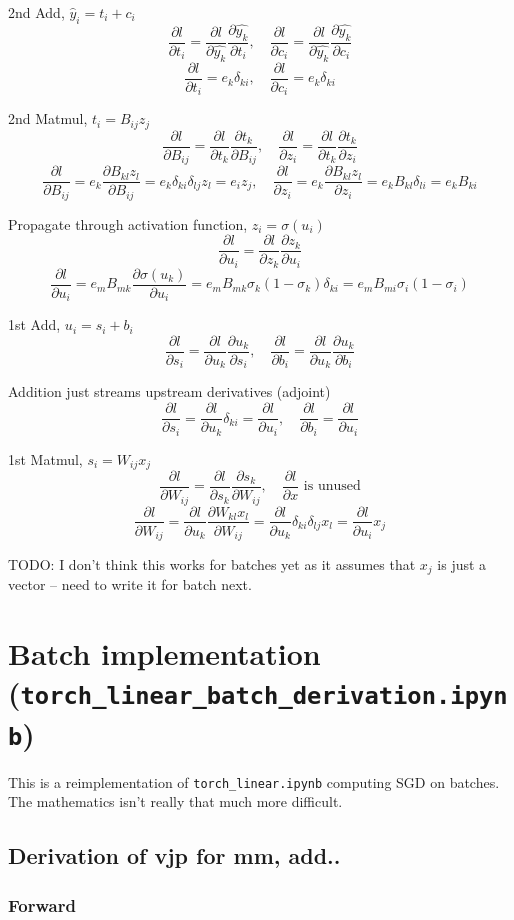 \documentclass[11pt]{article}
\newcommand{\pd}[2]{\frac{\partial #1}{\partial #2}}
\begin{document}
2nd Add, $\hat{y}_i = t_i + c_i$
\[
\pd{l}{t_i} = \pd{l}{\hat{y_k}} \pd{\hat{y_k}}{t_i}, \quad \pd{l}{c_i} = \pd{l}{\hat{y_k}} \pd{\hat{y_k}}{c_i}
\]
\[
\pd{l}{t_i} = e_k \delta_{ki}, \quad \pd{l}{c_i} = e_k \delta_{ki}
\]

2nd Matmul, $t_i = B_{ij} z_j$
\[
\pd{l}{B_{ij}} = \pd{l}{t_k} \pd{t_k}{B_{ij}}, \quad \pd{l}{z_i} = \pd{l}{t_k} \pd{t_k}{z_i}
\]
\[
\pd{l}{B_{ij}} = e_k \pd{B_{kl} z_l}{B_{ij}} = e_k \delta_{ki} \delta_{lj} z_l = e_i z_j, \quad \pd{l}{z_i} = e_k \pd{B_{kl} z_l}{z_i} = e_k B_{kl} \delta_{li} = e_k B_{ki}
\]

Propagate through activation function, $z_i = \sigma(u_i)$
\[
\pd{l}{u_i} = \pd{l}{z_k}\pd{z_k}{u_i}
\]
\[
\pd{l}{u_i} = e_m B_{mk} \pd{\sigma(u_k)}{u_i} = e_m B_{mk} \sigma_k(1-\sigma_k)\delta_{ki} = e_m B_{mi} \sigma_i(1-\sigma_i)
\]

1st Add, $u_i = s_i + b_i$
\[
\pd{l}{s_i} = \pd{l}{u_k} \pd{u_k}{s_i} , \quad \pd{l}{b_i} = \pd{l}{u_k} \pd{u_k}{b_i}
\]

Addition just streams upstream derivatives (adjoint)
\[
\pd{l}{s_i} = \pd{l}{u_k} \delta_{ki} = \pd{l}{u_i}, \quad \pd{l}{b_i} = \pd{l}{u_i}
\]

1st Matmul, $s_i = W_{ij} x_j$
\[
\pd{l}{W_{ij}} = \pd{l}{s_k}\pd{s_k}{W_{ij}}, \quad \pd{l}{x} \text{ is unused}
\]
\[
\pd{l}{W_{ij}} = \pd{l}{u_k}\pd{W_{kl} x_l}{W_{ij}} = \pd{l}{u_k}\delta_{ki} \delta_{lj} x_l = \pd{l}{u_i} x_j
\]

TODO: I don't think this works for batches yet as it assumes that $x_j$ is just
a vector -- need to write it for batch next.

\section{Batch implementation (\texttt{torch\_linear\_batch\_derivation.ipynb})}

This is a reimplementation of \texttt{torch\_linear.ipynb} computing SGD on
batches. The mathematics isn't really that much more difficult.

\subsection{Derivation of vjp for mm, add..}

\subsubsection*{Forward}
\end{document}
